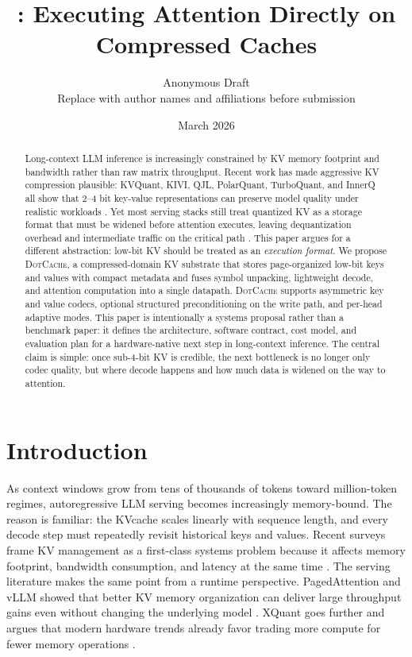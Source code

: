 \documentclass[11pt]{article}
\title{\vspace{-1.2em}\method: Executing Attention Directly on Compressed \kv{} Caches}
\author{Anonymous Draft\\\small Replace with author names and affiliations before submission}
\date{March 2026}
\newcommand{\method}{\textsc{DotCache}}
\newcommand{\kv}{KV}
\newcommand{\kvc}{\kv cache}
\begin{document}
\maketitle

\begin{abstract}
Long-context LLM inference is increasingly constrained by \kv{} memory footprint and bandwidth rather than raw matrix throughput. Recent work has made aggressive \kv{} compression plausible: KVQuant, KIVI, QJL, PolarQuant, TurboQuant, and InnerQ all show that 2--4 bit key-value representations can preserve model quality under realistic workloads \cite{kvquant,kivi,qjl,polarquant,turboquant,innerq}. Yet most serving stacks still treat quantized \kv{} as a storage format that must be widened before attention executes, leaving dequantization overhead and intermediate traffic on the critical path \cite{qserve,innerq}. This paper argues for a different abstraction: low-bit \kv{} should be treated as an \emph{execution format}. We propose \method{}, a compressed-domain \kv{} substrate that stores page-organized low-bit keys and values with compact metadata and fuses symbol unpacking, lightweight decode, and attention computation into a single datapath. \method{} supports asymmetric key and value codecs, optional structured preconditioning on the write path, and per-head adaptive modes. This paper is intentionally a systems proposal rather than a benchmark paper: it defines the architecture, software contract, cost model, and evaluation plan for a hardware-native next step in long-context inference. The central claim is simple: once sub-4-bit \kv{} is credible, the next bottleneck is no longer only codec quality, but where decode happens and how much data is widened on the way to attention.
\end{abstract}

\section{Introduction}

As context windows grow from tens of thousands of tokens toward million-token regimes, autoregressive LLM serving becomes increasingly memory-bound. The reason is familiar: the \kvc{} scales linearly with sequence length, and every decode step must repeatedly revisit historical keys and values. Recent surveys frame \kv{} management as a first-class systems problem because it affects memory footprint, bandwidth consumption, and latency at the same time \cite{kvcachesurvey}. The serving literature makes the same point from a runtime perspective. PagedAttention and vLLM showed that better \kv{} memory organization can deliver large throughput gains even without changing the underlying model \cite{pagedattention}. XQuant goes further and argues that modern hardware trends already favor trading more compute for fewer memory operations \cite{xquant}.
\end{document}
